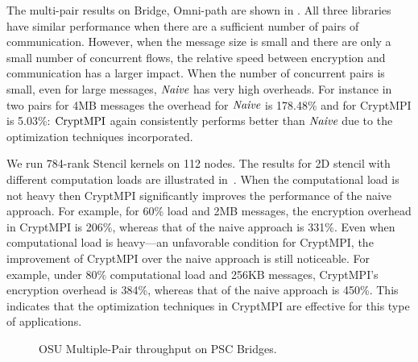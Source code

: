 The multi-pair results on Bridge, Omni-path are shown in
.
All three libraries have similar
performance when there are a sufficient number of pairs of communication.
However, when the message size is small and there are only a small number
of concurrent flows, the relative speed between encryption and communication
has a larger impact. When the number of concurrent pairs is small,
even for large messages, ${\emph{Naive}}$ has very high overheads. For instance in
two pairs for 4MB messages the overhead for ${\emph{Naive}}$  is 178.48\% and
for CryptMPI is 5.03\%: $\textrm{CryptMPI}$ again consistently performs
better than ${\emph{Naive}}$ due to the optimization techniques incorporated.


We run 784-rank Stencil kernels on 112 nodes. 
The results for 2D stencil with different computation loads
are illustrated in~. 
When the computational load is not heavy then CryptMPI
significantly improves the performance of the naive  approach. 
For example, for 60\% load and 2MB messages, 
the encryption overhead in CryptMPI is 206\%, 
whereas that of the naive approach is 331\%. 
Even when computational load is heavy---an unfavorable condition for CryptMPI, 
the improvement of CryptMPI over the naive approach is still noticeable. 
For example, under 80\% computational load and 256KB messages, CryptMPI's
encryption overhead is 384\%, 
whereas that of the naive approach is 450\%.
This indicates that the optimization techniques in CryptMPI
are effective for this type of applications. 


\begin{figure}[hbp]
\centering
	\captionsetup{singlelinecheck=false}
	\caption{OSU Multiple-Pair throughput on PSC Bridges. }
	\label{fig:xsede_multipair_infiniband}
	\vspace{-1.5ex}
	\end{figure}


